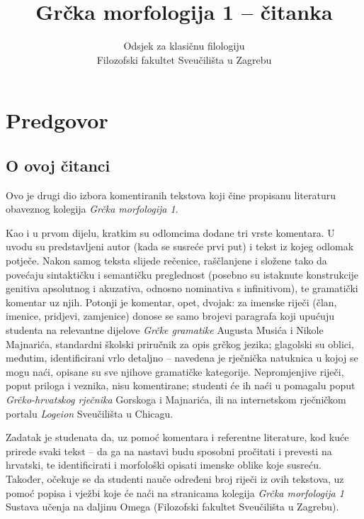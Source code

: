 \documentclass[a4paper,12pt,twoside]{report}
\newcommand{\subtitle}[1]{%
  \posttitle{%
    \par\end{center}
    \begin{center}\large#1\end{center}
    \vskip0.5em}%
}
\begin{document}
\title{Grčka morfologija 1 – čitanka}
\subtitle{Vježbe 21–40}
\author{Odsjek za klasičnu filologiju\\
Filozofski fakultet Sveučilišta u Zagrebu}
\maketitle

\clearpage
\thispagestyle{empty}




\chapter*{Predgovor}

\section*{O ovoj čitanci}

Ovo je drugi dio izbora komentiranih tekstova koji čine propisanu literaturu obaveznog kolegija \textit{Grčka morfologija 1}.

Kao i u prvom dijelu, kratkim su odlomcima dodane tri vrste komentara. U uvodu su predstavljeni autor (kada se susreće prvi put) i tekst iz kojeg odlomak potječe. Nakon samog teksta slijede rečenice, raščlanjene i složene tako da povećaju sintaktičku i semantičku preglednost (posebno su istaknute konstrukcije genitiva apsolutnog i akuzativa, odnosno nominativa s infinitivom), te gramatički komentar uz njih. Potonji je komentar, opet, dvojak: za imenske riječi (član, imenice, pridjevi, zamjenice) donose se samo brojevi paragrafa koji upućuju studenta na relevantne dijelove \textit{Grčke gramatike} Augusta Musića i Nikole Majnarića, standardni školski priručnik za opis grčkog jezika; glagolski su oblici, međutim, identificirani vrlo detaljno – navedena je rječnička natuknica u kojoj se mogu naći, opisane su sve njihove gramatičke kategorije. Nepromjenjive riječi, poput priloga i veznika, nisu komentirane; studenti će ih naći u pomagalu poput \textit{Grčko-hrvatskog rječnika} Gorskoga i Majnarića, ili na internetskom rječničkom portalu \textit{Logeion} Sveučilišta u Chicagu.

Zadatak je studenata da, uz pomoć komentara i referentne literature, kod kuće prirede svaki tekst – da ga na nastavi budu sposobni pročitati i prevesti na hrvatski, te identificirati i morfološki opisati imenske oblike koje susreću. Također, očekuje se da studenti nauče određeni broj riječi iz ovih tekstova, uz pomoć popisa i vježbi koje će naći na stranicama kolegija \textit{Grčka morfologija 1} Sustava učenja na daljinu Omega (Filozofski fakultet Sveučilišta u Zagrebu).
\end{document}
